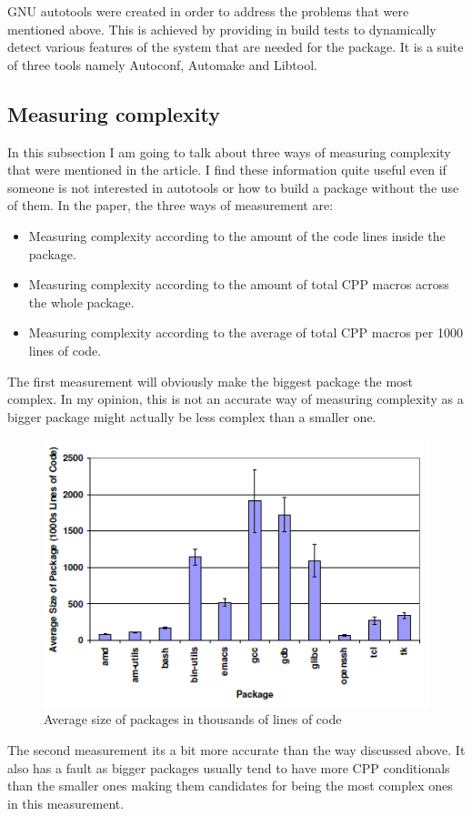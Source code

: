 \documentclass[11pt]{article}
\begin{document}
GNU autotools were created in order to address the problems that were mentioned above. This is achieved by providing in build tests to dynamically detect various features of the system that are needed for the package. It is a suite of three tools namely Autoconf, Automake and Libtool.

\subsection{Measuring complexity}
In this subsection I am going to talk about three ways of measuring complexity that were mentioned in the article. I find these information quite useful even if someone is not interested in autotools or how to build a package without the use of them. In the paper, the three ways of measurement are:
\begin{itemize}
\item Measuring complexity according to the amount of the code lines inside the package.
\item Measuring complexity according to the amount of total CPP macros across the whole package.
\item Measuring complexity according to the average of total CPP macros per 1000 lines of code.
\end{itemize}

The first measurement will obviously make the biggest package the most complex. In my opinion, this is not an accurate way of measuring complexity as a bigger package might actually be less complex than a smaller one.

\begin{figure}[!htb]
\centering
  \includegraphics[width=.7\linewidth]{images/measure1}
  \caption{Average size of packages in thousands of lines of
code \cite{zadok2002}}
  \label{fig:measure1}
\end{figure}
\FloatBarrier
The second measurement its a bit more accurate than the way discussed above. It also has a fault as bigger packages usually tend to have more CPP conditionals than the smaller ones making them candidates for being the most complex ones in this measurement.
\end{document}
